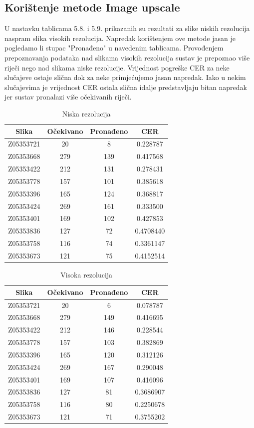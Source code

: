 \documentclass[times, utf8, zavrsni, numeric]{fer}
\begin{document}
\subsection{Korištenje metode Image upscale}
U nastavku tablicama 5.8. i 5.9. prikazanih su rezultati za slike niskih rezolucija naspram slika visokih rezolucija. Napredak korištenjem ove metode jasan je pogledamo li stupac "Pronađeno" u navedenim tablicama. Provođenjem prepoznavanja podataka nad slikama visokih rezolucija sustav je prepoznao više riječi nego nad slikama niske rezolucije. Vrijednost pogreške CER za neke slučajeve ostaje slična dok za neke primjećujemo jasan napredak. Iako u nekim slučajevima je vrijednost CER ostala slična idalje predstavljaju bitan napredak jer sustav pronalazi više očekivanih riječi.
\begin{table}[H]
	\caption{Niska rezolucija}
        \label{tbl:Blur 2}
        \centering
        \begin{tabular}{ |*{4}{c|} } \hline
	\multicolumn{1}{|c|}{Slika} & \multicolumn{1}{|c|}{Očekivano} & \multicolumn{1}{|c|}{Pronađeno} & \multicolumn{1}{|c|}{CER}\\ \hline
Z05353721&20&8&0.228787\\ \hline
Z05353668&279&139&0.417568\\ \hline
Z05353422&212&131&0.278431\\ \hline
Z05353778&157&101&0.385618\\ \hline
Z05353396&165&124&0.368817\\ \hline
Z05353424&269&161&0.333500\\ \hline
Z05353401&169&102&0.427853\\ \hline
Z05353836&127&72&0.4708440\\ \hline
Z05353758&116&74&0.3361147\\ \hline
Z05353673&121&75&0.4152514\\ \hline
	\end{tabular}
\end{table}

\begin{table}[H]
	\caption{Visoka rezolucija}
        \label{tbl:Blur 2}
        \centering
        \begin{tabular}{ |*{4}{c|} } \hline
	\multicolumn{1}{|c|}{Slika} & \multicolumn{1}{|c|}{Očekivano} & \multicolumn{1}{|c|}{Pronađeno} & \multicolumn{1}{|c|}{CER}\\ \hline
Z05353721&20&6&0.078787\\ \hline
Z05353668&279&149&0.416695\\ \hline
Z05353422&212&146&0.228544\\ \hline
Z05353778&157&103&0.382869\\ \hline
Z05353396&165&120&0.312126\\ \hline
Z05353424&269&167&0.290048\\ \hline
Z05353401&169&107&0.416096\\ \hline
Z05353836&127&81&0.3686907\\ \hline
Z05353758&116&80&0.2250678\\ \hline
Z05353673&121&71&0.3755202\\ \hline
	\end{tabular}
\end{table}
\end{document}
